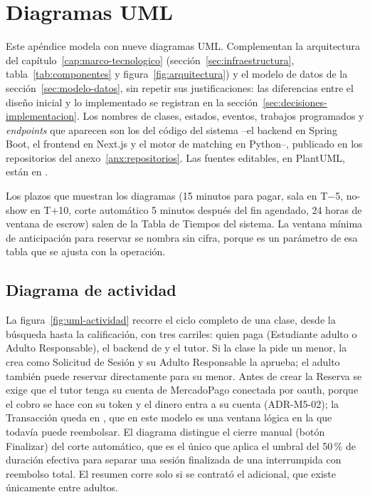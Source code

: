 
\chapter{Diagramas UML}\label{apx:uml}

Este apéndice modela \sistema{} con nueve diagramas UML. Complementan la
arquitectura del capítulo~\ref{cap:marco-tecnologico}
(sección~\ref{sec:infraestructura}, tabla~\ref{tab:componentes} y
figura~\ref{fig:arquitectura}) y el modelo de datos de la
sección~\ref{sec:modelo-datos}, sin repetir sus justificaciones: las
diferencias entre el diseño inicial y lo implementado se registran en la
sección~\ref{sec:decisiones-implementacion}. Los nombres de clases,
estados, eventos, trabajos programados y \emph{endpoints} que aparecen son
los del código del sistema --el backend en Spring Boot, el frontend en
Next.js y el motor de \gls{matching} en Python--, publicado en los
repositorios del anexo~\ref{anx:repositorios}. Las fuentes editables, en
PlantUML, están en .

Los plazos que muestran los diagramas (15 minutos para pagar, sala en
T$-$5, no-show en T$+$10, corte automático 5 minutos después del fin
agendado, 24 horas de ventana de \gls{escrow}) salen de la Tabla de
Tiempos del sistema. La ventana mínima de anticipación para reservar se
nombra sin cifra, porque es un parámetro de esa tabla que se ajusta con la
operación.

\section{Diagrama de actividad}

La figura~\ref{fig:uml-actividad} recorre el ciclo completo de una clase,
desde la búsqueda hasta la calificación, con tres carriles: quien paga
(Estudiante adulto o Adulto Responsable), el backend de \sistema{} y el
tutor. Si la clase la pide un menor, la crea como Solicitud de Sesión y su
Adulto Responsable la aprueba; el adulto también puede reservar
directamente para su menor. Antes de crear la Reserva se exige que el
tutor tenga su cuenta de MercadoPago conectada por \gls{oauth}, porque el
cobro se hace con su token y el dinero entra a su cuenta (ADR-M5-02); la
Transacción queda en , que en este modelo es una
ventana lógica en la que \sistema{} todavía puede reembolsar. El diagrama
distingue el cierre manual (botón Finalizar) del corte automático, que es
el único que aplica el umbral del 50\,\% de duración efectiva para
separar una sesión finalizada de una interrumpida con reembolso total.
El resumen corre solo si se contrató el adicional, que existe únicamente
entre adultos.

